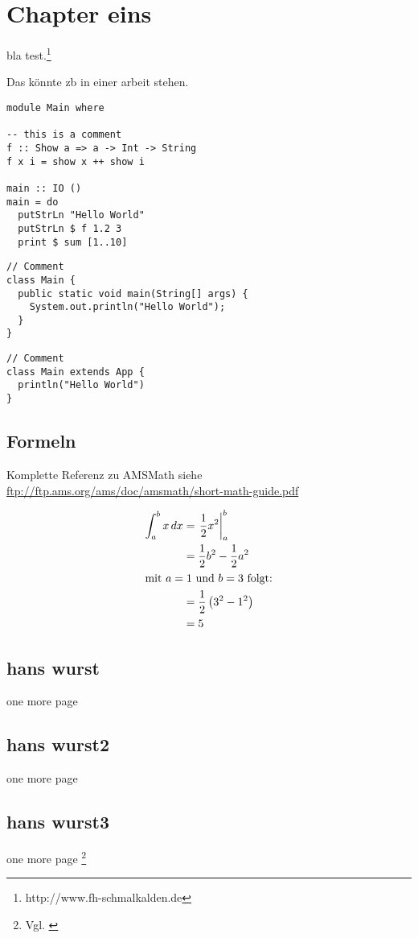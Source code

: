 \chapter{Chapter eins}
bla test.\footnote{http://www.fh-schmalkalden.de}

Das könnte \gls{zb} in einer arbeit stehen.

\begin{lstlisting}[label=listinghaskell,caption=This is Haskell]
module Main where

-- this is a comment
f :: Show a => a -> Int -> String
f x i = show x ++ show i

main :: IO ()
main = do
  putStrLn "Hello World"
  putStrLn $ f 1.2 3
  print $ sum [1..10]
\end{lstlisting}

\begin{lstlisting}[label=listingjava,caption=This is \gls{glo:Java}]
// Comment
class Main {
  public static void main(String[] args) {
    System.out.println("Hello World");
  }
}
\end{lstlisting}

\begin{lstlisting}[label=listingscala,caption=This is Scala]
// Comment
class Main extends App {
  println("Hello World")
}
\end{lstlisting}


\section{Formeln}

Komplette Referenz zu AMSMath siehe \\
\url{ftp://ftp.ams.org/ams/doc/amsmath/short-math-guide.pdf}

\begin{align}
 \int_{a}^{b} x\,dx
 & = \left.\frac{1}{2} x^2\right\vert_{a}^{b}\\
 & = \frac{1}{2} b^2 - \frac{1}{2} a^2 \\
 \intertext{mit $a=1$ und $b=3$ folgt:}
 \notag
 & = \frac{1}{2} \left(3^2 - 1^2\right)\\
 & = 5
\end{align}

\section{hans wurst}
one more page

\section{hans wurst2}
one more page

\section{hans wurst3}
one more page \footnote{Vgl. \cite{braun:scala}}
